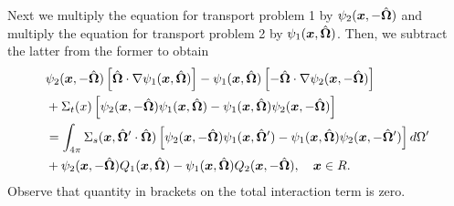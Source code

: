 Next we multiply the equation for transport problem 1 by $\psi_2(\bm{x},-\hat{\mathbf{\Omega}})$ and multiply the equation for transport problem 2 by $\psi_1(\bm{x},\hat{\mathbf{\Omega}})$. Then, we subtract the latter from the former to obtain
\begin{align}
  &\psi_2(\bm{x},-\hat{\mathbf{\Omega}}) \left[ \hat{\mathbf{\Omega}} \cdot \nabla \psi_1(\bm{x},\hat{\mathbf{\Omega}}) \right] - \psi_1(\bm{x},\hat{\mathbf{\Omega}}) \left[ -\hat{\mathbf{\Omega}} \cdot \nabla \psi_2(\bm{x},-\hat{\mathbf{\Omega}}) \right] \nonumber \\*
  &+ \Sigma_t(x) \left[ \psi_2(\bm{x},-\hat{\mathbf{\Omega}})  \psi_1(\bm{x},\hat{\mathbf{\Omega}}) -  \psi_1(\bm{x},\hat{\mathbf{\Omega}}) \psi_2(\bm{x},-\hat{\mathbf{\Omega}}) \right] \nonumber \\*
  &= \int_{4\pi} \Sigma_s(\bm{x},\hat{\mathbf{\Omega}}' \cdot \hat{\mathbf{\Omega}}) \left[ \psi_2(\bm{x},-\hat{\mathbf{\Omega}})  \psi_1(\bm{x},\hat{\mathbf{\Omega}}') -  \psi_1(\bm{x},\hat{\mathbf{\Omega}}) \psi_2(\bm{x},-\hat{\mathbf{\Omega}}') \right] d\Omega' \nonumber \\*
  &+ \psi_2(\bm{x},-\hat{\mathbf{\Omega}}) Q_1(\bm{x},\hat{\mathbf{\Omega}}) - \psi_1(\bm{x},\hat{\mathbf{\Omega}}) Q_2(\bm{x},-\hat{\mathbf{\Omega}}), \quad \bm{x} \in R.
\end{align}
Observe that quantity in brackets on the total interaction term is zero. 

